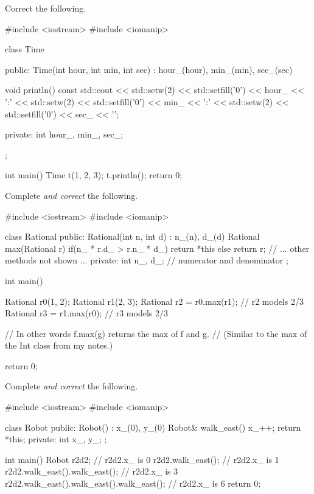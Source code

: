 

\nextq
Correct the following.
\\
\ANSWER
\begin{answercode}
#include <iostream>
#include <iomanip>

class Time
{
public:
    Time(int hour, int min, int sec)
        : hour_(hour), min_(min), sec_(sec)
    {}

    void println() const
    {
        std::cout << std::setw(2) << std::setfill('0') << hour_ << ':'
                  << std::setw(2) << std::setfill('0') << min_ << ':'
                  << std::setw(2) << std::setfill('0') << sec_ << '\n';
    }

private:
    int hour_, min_, sec_;
};

int main()
{
    Time t(1, 2, 3);
    t.println();
    return 0;
}
\end{answercode}

\nextq
Complete \textit{and correct} the following.
\\
\ANSWER
\begin{answercode}
#include <iostream>
#include <iomanip>

class Rational
{
public:
    Rational(int n, int d)
    : n_(n), d_(d)
    {}
    Rational max(Rational r)
    {
        if(n_ * r.d_ > r.n_ * d_) return *this
        else return r;
    }
    // ... other methods not shown ...
private:
    int n_, d_; // numerator and denominator
};

int main()
{
    Rational r0(1, 2);
    Rational r1(2, 3);
    Rational r2 = r0.max(r1); // r2 models 2/3
    Rational r3 = r1.max(r0); // r3 models 2/3

    // In other words f.max(g) returns the max of f and g.
    // (Similar to the max of the Int class from my notes.)

    return 0;
}
\end{answercode}

\nextq
Complete \textit{and correct} the following.
\\
\ANSWER
\begin{answercode}
#include <iostream>
#include <iomanip>

class Robot
{
public:
    Robot()
        : x_(0), y_(0)
    {}
    Robot& walk_east()
    {
        x_++;
        return *this;
    }
private:
    int x_, y_;
};

int main()
{
    Robot r2d2;                               // r2d2.x_ is 0
    r2d2.walk_east();                         // r2d2.x_ is 1
    r2d2.walk_east().walk_east();             // r2d2.x_ is 3
    r2d2.walk_east().walk_east().walk_east(); // r2d2.x_ is 6
    return 0;
}
\end{answercode}


